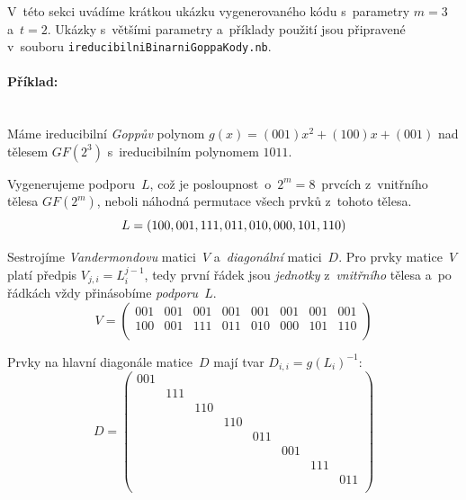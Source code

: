 \documentclass[thesis=M,czech,hidelinks]{FITthesis}[2012/06/26]
\newcommand{\0}{{\textcolor[gray]{0.75}{0}}}
\begin{document}
V~této sekci uvádíme krátkou ukázku vygenerovaného kódu s~parametry $m = 3$
a~$t = 2$. Ukázky s~většími parametry a~příklady použití jsou připravené
v~souboru \texttt{ireducibilniBinarniGoppaKody.nb}.

\paragraph{Příklad:} \hfil \\
Máme ireducibilní \emph{Goppův} polynom $g(x) = (001)x^2 + (100)x + (001)$ nad
tělesem $GF(2^3)$ s~ireducibilním polynomem $1011$.

Vygenerujeme podporu~$L$, což je posloupnost~o~$2^m = 8$~prvcích z~vnitřního
tělesa $GF(2^m)$, neboli náhodná permutace všech prvků z~tohoto tělesa.
$$
    L = \left(
            100, 001, 111, 011, 010, 000, 101, 110 \\
    \right)
$$

Sestrojíme \emph{Vandermondovu} matici~$V$ a~\emph{diagonální} matici~$D$. Pro
prvky matice~$V$ platí předpis $V_{j,i} = L_i^{j-1}$, tedy první řádek jsou
\emph{jednotky} z~\emph{vnitřního} tělesa a~po řádkách vždy přinásobíme
\emph{podporu}~$L$.
$$
    V = \left(
        \begin{array}{*{8}{c}}
            001 & 001 & 001 & 001 & 001 & 001 & 001 & 001 \\
            100 & 001 & 111 & 011 & 010 & 000 & 101 & 110 \\
        \end{array}
    \right)
$$

Prvky na hlavní diagonále matice~$D$ mají tvar $D_{i,i} = g(L_i)^{-1}$:
$$
    D = \left(
        \begin{array}{*{8}{c}}
            001 &     &     &     &     &     &     &     \\
                & 111 &     &     &     &     &     &     \\
                &     & 110 &     &     &     &     &     \\
                &     &     & 110 &     &     &     &     \\
                &     &     &     & 011 &     &     &     \\
                &     &     &     &     & 001 &     &     \\
                &     &     &     &     &     & 111 &     \\
                &     &     &     &     &     &     & 011 \\
        \end{array}
    \right)
$$
\end{document}
